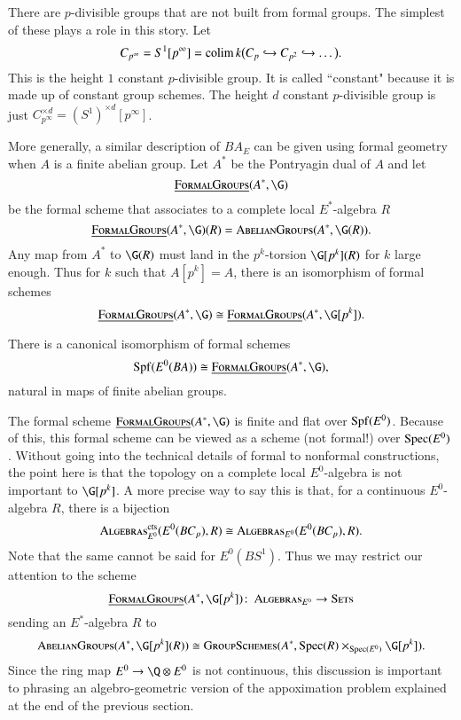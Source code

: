 There are $p$-divisible groups that are not built from formal groups. The simplest of these plays a role in this story. Let 
\[
C_{p^{\infty}} = S^1[p^\infty] = \operatorname*{colim}{k} \big ( C_p \hookrightarrow C_{p^2} \hookrightarrow \ldots \big ).
\]
This is the height $1$ constant $p$-divisible group. It is called ``constant" because it is made up of constant group schemes. The height $d$ constant $p$-divisible group is just $C_{p^\infty}^{\times d} = (S^1)^{\times d}[p^\infty]$.

More generally, a similar description of $BA_{E}$ can be given using formal geometry when $A$ is a finite abelian group. Let $A^*$ be the Pontryagin dual of $A$ and let
\[
\InternalHom{FormalGroups}(A^*, \G)
\]
be the formal scheme that associates to a complete local $E^*$-algebra $R$
\[
\InternalHom{FormalGroups}(A^*, \G)(R) = \CatOf{AbelianGroups}(A^*, \G(R)).
\]
Any map from $A^*$ to $\G(R)$ must land in the $p^k$-torsion $\G[p^k](R)$ for $k$ large enough. Thus for $k$ such that $A[p^k] = A$, there is an isomorphism of formal schemes
\[
\InternalHom{FormalGroups}(A^*, \G) \cong \InternalHom{FormalGroups}(A^*, \G[p^k]).
\]
\begin{proposition}
There is a canonical isomorphism of formal schemes
\[
\Spf(E^0(BA)) \cong \InternalHom{FormalGroups}(A^*, \G),
\]
natural in maps of finite abelian groups.
\end{proposition}

The formal scheme $\InternalHom{FormalGroups}(A^*,\G)$ is finite and flat over $\operatorname{Spf}(E^0)$. Because of this, this formal scheme can be viewed as a scheme (not formal!) over $\operatorname{Spec}(E^0)$. Without going into the technical details of formal to nonformal constructions, the point here is that the topology on a complete local $E^0$-algebra is not important to $\G[p^k]$. A more precise way to say this is that, for a continuous $E^0$-algebra $R$, there is a bijection
\[
\normalfont\textsc{Algebras}_{E^0}^{\mathrm{cts}}(E^0(BC_p),R) \cong \normalfont\textsc{Algebras}_{E^0}(E^0(BC_p),R).
\]
Note that the same cannot be said for $E^0(BS^1)$. Thus we may restrict our attention to the scheme
\[
\InternalHom{FormalGroups}(A^*,\G[p^k]) \co \CatOf{Algebras}_{E^0} \rightarrow \CatOf{Sets}
\]
sending an $E^*$-algebra $R$ to
\[
\CatOf{AbelianGroups}(A^*, \G[p^k](R)) \cong \CatOf{GroupSchemes}(A^*, \Spec(R) \times_{\Spec(E^0)} \G[p^k]).
\]
Since the ring map $E^0 \rightarrow \Q \otimes E^0$ is not continuous, this discussion is important to phrasing an algebro-geometric version of the appoximation problem explained at the end of the previous section.


